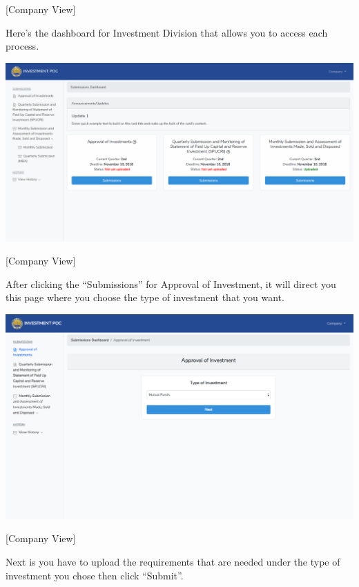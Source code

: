 \documentclass{article}
\begin{document}
\noindent{}[Company View]%

Here’s the dashboard for Investment Division that
allows you to access each process.%

\includegraphics[keepaspectratio=true]{up-ic-screens/image82}{}%

[Company View]%

After clicking the “Submissions” for Approval of
Investment, it will direct you this page where you choose the type of
investment that you want.%

\includegraphics[keepaspectratio=true]{up-ic-screens/image60}{}%

[Company View]%

Next is you have to upload the requirements that
are needed under the type of investment you chose then click
“Submit”.%
\end{document}
